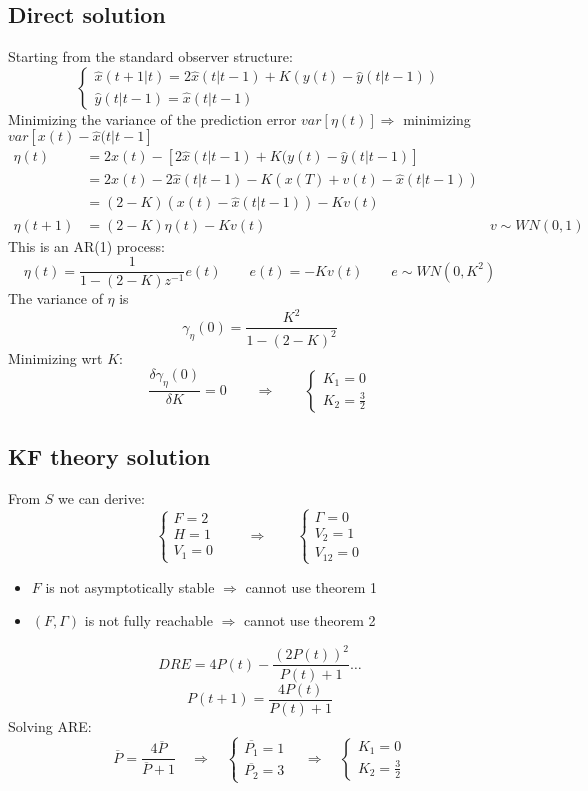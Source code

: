 \documentclass{report}
\begin{document}
\subsection{Direct solution}
Starting from the standard observer structure:
\[
\begin{cases}
\hat{x}(t+1|t)=2\hat{x}(t|t-1)+K(y(t)-\hat{y}(t|t-1))\\
\hat{y}(t|t-1)=\hat{x}(t|t-1)
\end{cases}
\]
Minimizing the variance of the prediction error $var[\eta(t)]\Rightarrow$ minimizing $var[x(t)-\hat{x}(t|t-1]$
\begin{align*}
\eta(t)&=
2x(t)-[2\hat{x}(t|t-1)+K(y(t)-\hat{y}(t|t-1)]\\
&=2x(t)-2\hat{x}(t|t-1)-K(x(T)+v(t)-\hat{x}(t|t-1))\\
&=(2-K)(x(t)-\hat{x}(t|t-1))-Kv(t)\\
\eta(t+1)&=(2-K)\eta(t)-Kv(t)&v\sim WN(0,1)
\end{align*}
This is an AR(1) process:
\[
\eta(t)=\frac{1}{
1-(2-K)z^{-1}
}e(t)
\qquad
e(t)=-Kv(t)
\qquad
e\sim WN(0,K^2)
\]
The variance of $\eta$ is
\[
\gamma_\eta(0)=\frac{K^2}{1-(2-K)^2}
\]
Minimizing wrt $K$:
\[
\frac{\delta \gamma_\eta(0)}{\delta K}=0
\qquad\Rightarrow\qquad
\begin{cases}
K_1=0\\
K_2=\frac{3}{2}
\end{cases}
\]
\subsection{KF theory solution}
From $S$ we can derive:
\[
\begin{cases}
F=2\\H=1\\V_1=0
\end{cases}
\qquad\Rightarrow\qquad
\begin{cases}
\Gamma=0\\V_2=1\\V_{12}=0
\end{cases}
\]
\begin{itemize}
\item $F$ is not asymptotically stable $\Rightarrow$ cannot use theorem 1
\item $(F,\Gamma)$ is not fully reachable $\Rightarrow$ cannot use theorem 2
\end{itemize}
\[
DRE=4P(t)-\frac{(2P(t))^2}{P(t)+1}\dots
\]
\[
P(t+1)=\frac{4P(t)}{P(t)+1}
\]
Solving ARE:
\[
\overline{P}=\frac{4\overline{P}}{\overline{P}+1}
\quad\Rightarrow\quad
\begin{cases}
\overline{P_1}=1\\
\overline{P_2}=3
\end{cases}
\quad\Rightarrow\quad
\begin{cases}
K_1=0\\
K_2=\frac{3}{2}
\end{cases}
\]
\end{document}
